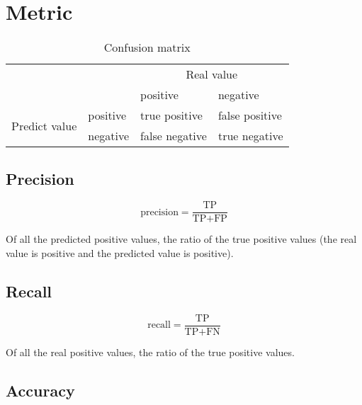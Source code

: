 
\chapter{Metric}
\label{cha:metric}

\begin{table}[H]
  \centering
  \begin{tabular}{ll|ll}
    \toprule
    \multicolumn{2}{l}{} & \multicolumn{2}{c}{Real value}\\
    \multicolumn{2}{l}{} & positive & negative \\
    \midrule
    \multirow{2}{*}{Predict value} & positive & true positive & false positive\\
    & negative & false negative & true negative\\
    \bottomrule
  \end{tabular}
  \caption{Confusion matrix}
  \label{tab:metric}
\end{table}

\section{Precision}
\label{sec:precision}



\begin{equation}
  \label{eq:2}
  \mbox{precision} = \frac{\mbox{TP}}{\mbox{TP} + \mbox{FP}}
\end{equation}


Of all the predicted positive values, the ratio of the true positive values (the real value is positive and the predicted value is positive).



\section{Recall}
\label{sec:recall}



\begin{equation}
  \label{eq:3}
  \mbox{recall} = \frac{\mbox{TP}}{\mbox{TP} + \mbox{FN}}
\end{equation}


Of all the real positive values, the ratio of the true positive values.


\section{Accuracy}
\label{sec:accuracy}

